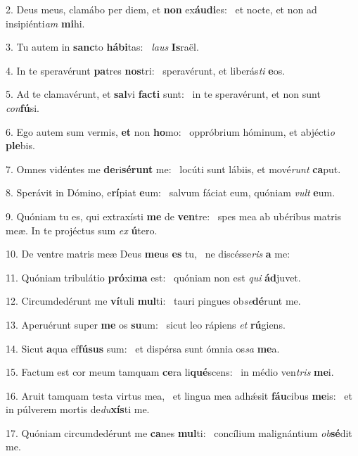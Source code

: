 2. Deus meus, clamábo per diem, et \textbf{non} ex\textbf{áu}\textbf{di}es: \ast\  et nocte, et non ad insipiénti\textit{am} \textbf{mi}hi.\

3. Tu autem in \textbf{sanc}to \textbf{há}\textbf{bi}tas: \ast\  \textit{laus} \textbf{Is}raël.\

4. In te speravérunt \textbf{pa}tres \textbf{nos}tri: \ast\  speravérunt, et liberás\textit{ti} \textbf{e}os.\

5. Ad te clamavérunt, et \textbf{sal}vi \textbf{fac}\textbf{ti} sunt: \ast\  in te speravérunt, et non sunt \textit{con}\textbf{fú}si.\

6. Ego autem sum vermis, \textbf{et} non \textbf{ho}mo: \ast\  oppróbrium hóminum, et abjécti\textit{o} \textbf{ple}bis.\

7. Omnes vidéntes me \textbf{de}ri\textbf{sé}\textbf{runt} me: \ast\  locúti sunt lábiis, et mové\textit{runt} \textbf{ca}put.\

8. Sperávit in Dómino, e\textbf{rí}piat \textbf{e}um: \ast\  salvum fáciat eum, quóniam \textit{vult} \textbf{e}um.\

9. Quóniam tu es, qui extraxísti \textbf{me} de \textbf{ven}tre: \ast\  spes mea ab ubéribus matris meæ. In te projéctus sum \textit{ex} \textbf{ú}tero.\

10. De ventre matris meæ Deus \textbf{me}us \textbf{es} tu, \ast\  ne discésse\textit{ris} \textbf{a} me:\

11. Quóniam tribulátio \textbf{pró}xi\textbf{ma} est: \ast\  quóniam non est \textit{qui} \textbf{ád}juvet.\

12. Circumdedérunt me \textbf{ví}tuli \textbf{mul}ti: \ast\  tauri pingues ob\textit{se}\textbf{dé}runt me.\

13. Aperuérunt super \textbf{me} os \textbf{su}um: \ast\  sicut leo rápiens \textit{et} \textbf{rú}giens.\

14. Sicut \textbf{a}qua ef\textbf{fú}\textbf{sus} sum: \ast\  et dispérsa sunt ómnia os\textit{sa} \textbf{me}a.\

15. Factum est cor meum tamquam \textbf{ce}ra li\textbf{qué}scens: \ast\  in médio ven\textit{tris} \textbf{me}i.\

16. Aruit tamquam testa virtus mea, \dag\  et lingua mea adhǽsit \textbf{fáu}cibus \textbf{me}is: \ast\  et in púlverem mortis de\textit{du}\textbf{xís}ti me.\

17. Quóniam circumdedérunt me \textbf{ca}nes \textbf{mul}ti: \ast\  concílium malignántium \textit{ob}\textbf{sé}dit me.\

